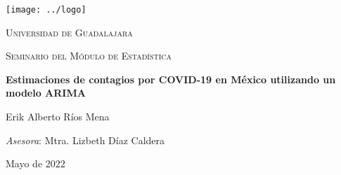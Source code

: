 \documentclass[11pt,letterpaper]{article}
\theoremstyle{definition}
\theoremstyle{theorem}
\theoremstyle{remark}
\begin{document}
	\begin{titlepage}
		\thispagestyle{empty}
		\centering
		\texttt{[image: ../logo]}\par\vspace{1cm}
		{\scshape\huge Universidad de Guadalajara\par}
		{\scshape\LARGE Seminario del Módulo de Estadística\par}
		\vspace*{1em}
		{\huge\bfseries Estimaciones de contagios por COVID-19 en México utilizando un modelo ARIMA\par}
		\vspace*{1em}
		{\Large Erik Alberto Ríos Mena\par}
		{\Large\textit{Asesora}: Mtra. Lizbeth Díaz Caldera\par}
		\vfill
		{\large Mayo de 2022\par}
	\end{titlepage}
	\rhead{}
	\tableofcontents
	\clearpage
	\listoftables
	\listoffigures
	\clearpage
\end{document}
